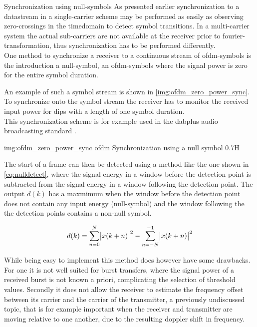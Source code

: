 \begin{subchapter}{Synchronization using null-symbols}
  As presented earlier synchronization to a datastream in a single-carrier scheme
  may be performed as easily as observing zero-crossings in the
  timedomain to detect symbol transitions.
  In a multi-carrier system the actual sub-carriers are not available
  at the receiver prior to fourier-transformation,
  thus synchronization has to be performed
  differently. \\

  One method to synchronize a receiver to a continuous stream
  of \gls{ofdm}-symbols is the introduction a null-symbol,
  an \gls{ofdm}-symbols where the signal power is zero for the
  entire symbol duration.

  An example of such a symbol stream is shown in
  \autoref{img:ofdm_zero_power_sync}.
  To synchronize onto the symbol stream the receiver has
  to monitor the received input power for dips with a
  length of one symbol duration. \\

  This synchronization scheme is for example used in
  the \acrshort{dabplus} audio broadcasting standard \cite{dabstandard}.

               {img:ofdm_zero_power_sync}
               {\acrshort{ofdm} Synchronization using a null symbol}
               {0.7}{H}

  The start of a frame can then be detected using
  a method like the one shown in \autoref{eq:nulldetect},
  where the signal energy in a window before the detection point
  is subtracted from the signal energy in a window following the detection point.
  The output $d(k)$ has a maxmimum when the window before the detection
  point does not contain any input energy (null-symbol) and
  the window following the the detection points contains a
  non-null symbol.

  \begin{equation}
    \label{eq:nulldetect}
    d(k)= \sum_{n=0}^{N} \abs{x(k+n)}^2 - \sum_{n=-N}^{-1} \abs{x(k+n)}^2
  \end{equation}

  While being easy to implement this method does however
  have some drawbacks.
  For one it is not well suited for burst transfers,
  where the signal power of a received burst is not
  known a priori, complicating the selection of threshold
  values.
  Secondly it does not allow the receiver to estimate the
  frequency offset between its carrier and the carrier of the
  transmitter, a previously undiscussed topic, that is
  for example important when the receiver and transmitter
  are moving relative to one another, due to the resulting doppler
  shift in frequency.
\end{subchapter}

